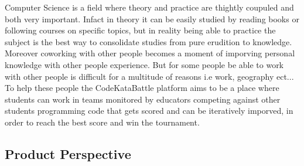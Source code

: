 Computer Science is a field where theory and practice are thightly coupuled and both very important.
Infact in theory it can be easily studied by reading books or following courses on specific topics, but in reality being able to practice the subject is the best way to consolidate studies from pure erudition to knowledge.
Moreover coworking with other people becomes a moment of imporving personal knowledge with other people experience.
But for some people be able to work with other people is difficult for a multitude of reasons i.e work, geography ect... 
To help these people the CodeKataBattle platform aims to be a place where students can work in teams monitored by educators competing against other students programming code that gets scored and can be iteratively imporved, in order to reach the best score and win the tournament.
\subsection{Product Perspective}

